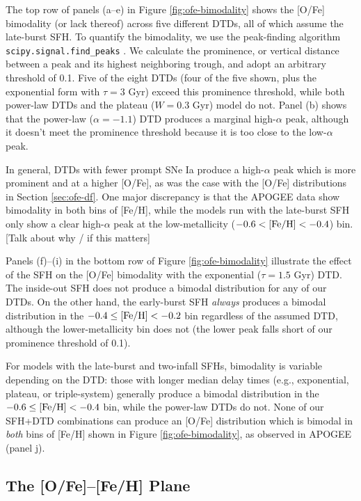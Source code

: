 \documentclass[twocolumn,twocolappendix,linenumbers,trackchanges]{aastex631}
\begin{document}
The top row of panels (a--e) in Figure \ref{fig:ofe-bimodality} shows the [O/Fe] bimodality (or lack thereof) across five different DTDs, all of which assume the late-burst SFH. To quantify the bimodality, we use the peak-finding algorithm {\tt scipy.signal.find\_peaks} \citep{2020SciPy-NMeth}. We calculate the prominence, or vertical distance between a peak and its highest neighboring trough, and adopt an arbitrary threshold of 0.1. Five of the eight DTDs (four of the five shown, plus the exponential form with $\tau=3$ Gyr) exceed this prominence threshold, while both power-law DTDs and the plateau ($W=0.3$ Gyr) model do not. Panel (b) shows that the power-law ($\alpha=-1.1$) DTD produces a marginal high-$\alpha$ peak, although it doesn't meet the prominence threshold because it is too close to the low-$\alpha$ peak. 

In general, DTDs with fewer prompt SNe Ia produce a high-$\alpha$ peak which is more prominent and at a higher [O/Fe], as was the case with the [O/Fe] distributions in Section \ref{sec:ofe-df}. One major discrepancy is that the APOGEE data show bimodality in both bins of [Fe/H], while the models run with the late-burst SFH only show a clear high-$\alpha$ peak at the low-metallicity ($-0.6<{\rm [Fe/H]}<-0.4$) bin. [Talk about why / if this matters]

Panels (f)--(i) in the bottom row of Figure \ref{fig:ofe-bimodality} illustrate the effect of the SFH on the [O/Fe] bimodality with the exponential ($\tau=1.5$ Gyr) DTD. The inside-out SFH does not produce a bimodal distribution for any of our DTDs. On the other hand, the early-burst SFH {\it always} produces a bimodal distribution in the $-0.4\leq{\rm [Fe/H]}<-0.2$ bin regardless of the assumed DTD, although the lower-metallicity bin does not (the lower peak falls short of our prominence threshold of 0.1). 

For models with the late-burst and two-infall SFHs, bimodality is variable depending on the DTD: those with longer median delay times (e.g., exponential, plateau, or triple-system) generally produce a bimodal distribution in the $-0.6\leq{\rm [Fe/H]}<-0.4$ bin, while the power-law DTDs do not. None of our SFH+DTD combinations can produce an [O/Fe] distribution which is bimodal in {\it both} bins of [Fe/H] shown in Figure \ref{fig:ofe-bimodality}, as observed in APOGEE (panel j).

\subsection{The [O/Fe]--[Fe/H] Plane}
\label{sec:ofe-feh}
\end{document}
